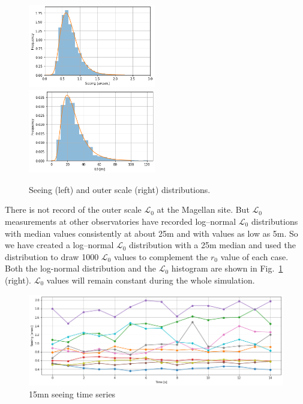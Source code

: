 \documentclass{gmto}
\begin{document}
\begin{figure}
  \centering
  \includegraphics[width=0.495\textwidth]{seeing_distribution.png}
  \includegraphics[width=0.495\textwidth]{L0_distribution.png}  
  \caption{Seeing (left) and outer scale (right) distributions.}
  \label{fig:8}
\end{figure}

There is not record of the outer scale $\mathcal L_0$ at the Magellan site.
But $\mathcal L_0$ measurements at other observatories \cite{myself} have
recorded log--normal $\mathcal L_0$ distributions with  median values
consistently at about 25m and with values as low as 5m.
So we have created a log--normal $\mathcal L_0$ distribution with a 25m median
and used the distribution to draw 1000 $\mathcal L_0$ values to complement
the $r_0$ value of each case.
Both the log-normal distribution and the $\mathcal L_0$ histogram are shown in
Fig.~\ref{fig:8} (right).
$\mathcal L_0$ values will remain constant during the whole simulation.


\begin{figure}
  \centering
  \includegraphics[width=\linewidth]{seeing_15mn_timeseries.png}
  \caption{15mn seeing time series}
  \label{fig:10}
\end{figure}
\end{document}
